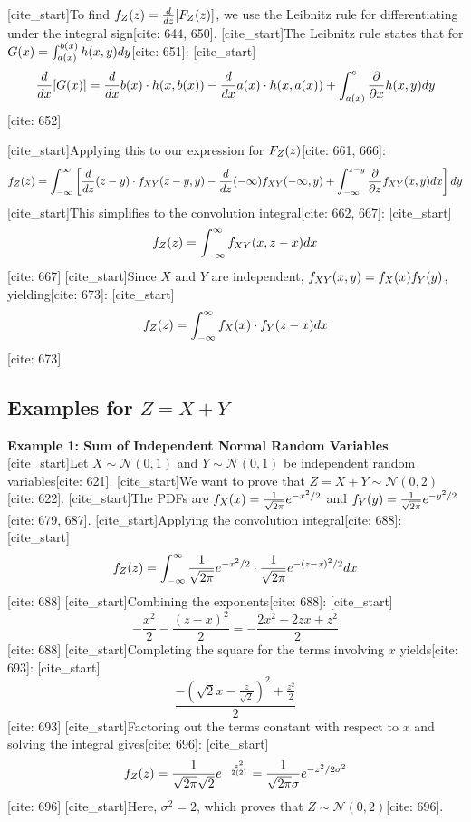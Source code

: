 \documentclass[11pt]{article}
\begin{document}
[cite_start]To find $f\sb{Z}(z) = \frac{d}{dz}[F\sb{Z}(z)]$, we use the Leibnitz rule for differentiating under the integral sign[cite: 644, 650].
[cite_start]The Leibnitz rule states that for $G(x) = \int\sb{a(x)}^{b(x)} h(x,y) dy$[cite: 651]:
[cite_start]$$\frac{d}{dx}[G(x)] = \frac{d}{dx}b(x) \cdot h(x, b(x)) - \frac{d}{dx}a(x) \cdot h(x, a(x)) + \int\sb{a(x)}^{c} \frac{\partial}{\partial x} h(x,y) dy$$ [cite: 652]

[cite_start]Applying this to our expression for $F\sb{Z}(z)$[cite: 661, 666]:
$$f\sb{Z}(z) = \int\sb{-\infty}^{\infty} \left[ \frac{d}{dz}(z-y) \cdot f\sb{XY}(z-y, y) - \frac{d}{dz}(-\infty) f\sb{XY}(-\infty, y) + \int\sb{-\infty}^{z-y} \frac{\partial}{\partial z} f\sb{XY}(x,y) dx \right] dy$$
[cite_start]This simplifies to the convolution integral[cite: 662, 667]:
[cite_start]$$f\sb{Z}(z) = \int\sb{-\infty}^{\infty} f\sb{XY}(x, z-x) dx$$ [cite: 667]
[cite_start]Since $X$ and $Y$ are independent, $f\sb{XY}(x,y) = f\sb{X}(x)f\sb{Y}(y)$, yielding[cite: 673]:
[cite_start]$$f\sb{Z}(z) = \int\sb{-\infty}^{\infty} f\sb{X}(x) \cdot f\sb{Y}(z-x) dx$$ [cite: 673]

\subsection{Examples for $Z = X + Y$}

\textbf{Example 1: Sum of Independent Normal Random Variables}
[cite_start]Let $X \sim \mathcal{N}(0,1)$ and $Y \sim \mathcal{N}(0,1)$ be independent random variables[cite: 621]. [cite_start]We want to prove that $Z = X + Y \sim \mathcal{N}(0,2)$[cite: 622].
[cite_start]The PDFs are $f\sb{X}(x) = \frac{1}{\sqrt{2\pi}} e^{-x^2/2}$ and $f\sb{Y}(y) = \frac{1}{\sqrt{2\pi}} e^{-y^2/2}$[cite: 679, 687].
[cite_start]Applying the convolution integral[cite: 688]:
[cite_start]$$f\sb{Z}(z) = \int\sb{-\infty}^{\infty} \frac{1}{\sqrt{2\pi}} e^{-x^2/2} \cdot \frac{1}{\sqrt{2\pi}} e^{-(z-x)^2/2} dx$$ [cite: 688]
[cite_start]Combining the exponents[cite: 688]:
[cite_start]$$-\frac{x^2}{2} - \frac{(z-x)^2}{2} = -\frac{2x^2 - 2zx + z^2}{2}$$ [cite: 688]
[cite_start]Completing the square for the terms involving $x$ yields[cite: 693]:
[cite_start]$$\frac{-\left(\sqrt{2}x - \frac{z}{\sqrt{2}}\right)^2 + \frac{z^2}{2}}{2}$$ [cite: 693]
[cite_start]Factoring out the terms constant with respect to $x$ and solving the integral gives[cite: 696]:
[cite_start]$$f\sb{Z}(z) = \frac{1}{\sqrt{2\pi}\sqrt{2}} e^{-\frac{z^2}{2(2)}} = \frac{1}{\sqrt{2\pi}\sigma} e^{-z^2/2\sigma^2}$$ [cite: 696]
[cite_start]Here, $\sigma^2 = 2$, which proves that $Z \sim \mathcal{N}(0,2)$[cite: 696].
\end{document}

